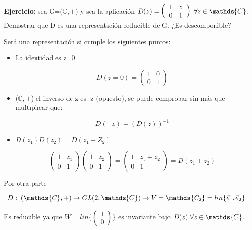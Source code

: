 \documentclass{article}
\begin{document}
    \textbf{Ejercicio:} sea G=($\mathds{C},+$) y sea la aplicación $D(z)=\left ( \begin{array}{cc}
        1 & z \\
        0 & 1
    \end{array} \right ) \hspace{0.1cm} \forall z\in \mathds{C}$. Demostrar que D es una representación reducible de G. ¿Es descomponible?
    
    \bigskip
    Será una representación si cumple los siguientes puntos:
    
    \begin{itemize}
        \item La identidad es z=0
        
        $$D(z=0)=\left ( \begin{array}{cc}
            1 &  0\\
            0 & 1
        \end{array} \right )$$
        
        \item  ($\mathds{C},+$) el inverso de z es -z (opuesto), se puede comprobar sin más que multiplicar que:
        
        $$D(-z)=(D(z))^{-1}$$
        
        \item $D(z_1)D(z_2)=D(z_1+Z_2)$
        
        $$\left ( \begin{array}{cc}
            1 & z_1 \\
            0 & 1
        \end{array}\right)\left ( \begin{array}{cc}
            1 & z_2 \\
            0 & 1
        \end{array}\right)=\left ( \begin{array}{cc}
            1 & z_1 +z_2 \\
            0 & 1
        \end{array}\right)=D(z_1+z_2)$$
    \end{itemize}
    
    Por otra parte 
    
    $$D: \hspace{0.1cm} (\mathds{C},+)\to GL(2, \mathds{C}) \to V=\mathds{C_2}=lin \lbrace \Vec{e}_1,\Vec{e}_2\rbrace$$
    
    Es reducible ya que $W= lin \lbrace \left ( \begin{array}{c}
         1  \\
         0 
    \end{array}\right) \rbrace$ es invariante bajo $D(z)\hspace{0.1cm} \forall z \in \mathds{C}$.
    
\end{document}
